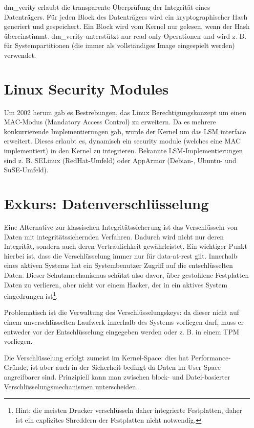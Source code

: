 dm\_verity erlaubt die transparente Überprüfung der Integrität eines Datenträgers. Für jeden Block des Datenträgers wird ein kryptographischer Hash generiert und gespeichert. Ein Block wird vom Kernel nur gelesen, wenn der Hash übereinstimmt. dm\_verity unterstützt nur read-only Operationen und wird z. B. für Systempartitionen (die immer als vollständiges Image eingespielt werden) verwendet.

\section{Linux Security Modules}

Um 2002 herum gab es Bestrebungen, das Linux Berechtigungskonzept um einen MAC-Modus (Mandatory Access Control) zu erweitern. Da es mehrere konkurrierende Implementierungen gab, wurde der Kernel um das LSM interface erweitert. Dieses erlaubt es, dynamisch ein security module (welches eine MAC implementiert) in den Kernel zu integrieren. Bekannte LSM-Implementierungen sind z. B. SELinux (RedHat-Umfeld) oder AppArmor (Debian-, Ubuntu- und SuSE-Umfeld).

\section{Exkurs: Datenverschlüsselung}

Eine Alternative zur klassischen Integritätssicherung ist das Verschlüsseln von Daten mit integritätssichernden Verfahren. Dadurch wird nicht nur deren Integrität, sondern auch deren Vertraulichkeit gewährleistet. Ein wichtiger Punkt hierbei ist, dass die Verschlüsselung immer nur für data-at-rest gilt. Innerhalb eines aktiven Systems hat ein Systembenutzer Zugriff auf die entschlüsselten Daten. Dieser Schutzmechanismus schützt also davor, über gestohlene Festplatten Daten zu verlieren, aber nicht vor einem Hacker, der in ein aktives System eingedrungen ist\footnote{Hint: die meisten Drucker verschlüsseln daher integrierte Festplatten, daher ist ein explizites Shreddern der Festplatten nicht notwendig.}.

Problematisch ist die Verwaltung des Verschlüsselungskeys: da dieser nicht auf einem unverschlüsselten Laufwerk innerhalb des Systems vorliegen darf, muss er entweder vor der Entschlüsselung eingegeben werden oder z. B. in einem TPM vorliegen.

Die Verschlüsselung erfolgt zumeist im Kernel-Space: dies hat Performance-Gründe, ist aber auch in der Sicherheit bedingt da Daten im User-Space angreifbarer sind. Prinzipiell kann man zwischen block- und Datei-basierter Verschlüsselungsmechanismen unterscheiden.

